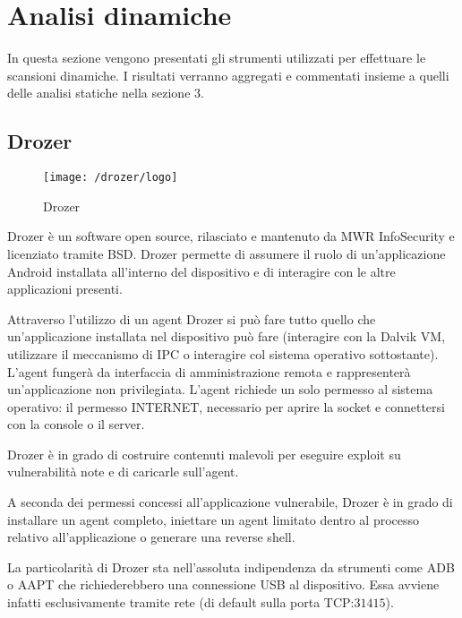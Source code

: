 \chapter{Analisi dinamiche}
In questa sezione vengono presentati gli strumenti utilizzati per effettuare le scansioni dinamiche. I risultati verranno aggregati e commentati insieme a quelli delle analisi statiche nella sezione $3$.


\section{Drozer}

\begin{figure}[h]
	\centering 
	\texttt{[image: /drozer/logo]} 
	\caption{Drozer}
	\label{fig:drozer}
\end{figure}

Drozer\cite{Drozer} è un software open source, rilasciato e mantenuto da MWR InfoSecurity e licenziato tramite BSD. Drozer permette di assumere il ruolo di un'applicazione Android installata all'interno del dispositivo e di interagire con le altre applicazioni presenti.

Attraverso l'utilizzo di un agent Drozer si può fare tutto quello che un'applicazione installata nel dispositivo può fare (interagire con la Dalvik VM, utilizzare il meccanismo di \ac{IPC} o interagire col sistema operativo sottostante). L'agent fungerà da interfaccia di amministrazione remota e rappresenterà un'applicazione non privilegiata. L'agent richiede un solo permesso al sistema operativo: il permesso INTERNET, necessario per aprire la socket e connettersi con la console o il server. 

Drozer è in grado di costruire contenuti malevoli per eseguire exploit su vulnerabilità note e di caricarle sull'agent.

A seconda dei permessi concessi all'applicazione vulnerabile, Drozer è in grado di installare un agent completo, iniettare un agent limitato dentro al processo relativo all'applicazione o generare una reverse shell.

La particolarità di Drozer sta nell'assoluta indipendenza da strumenti come ADB o \ac{AAPT} che richiederebbero una connessione USB al dispositivo. Essa avviene infatti esclusivamente tramite rete (di default sulla porta TCP:$31415$).

